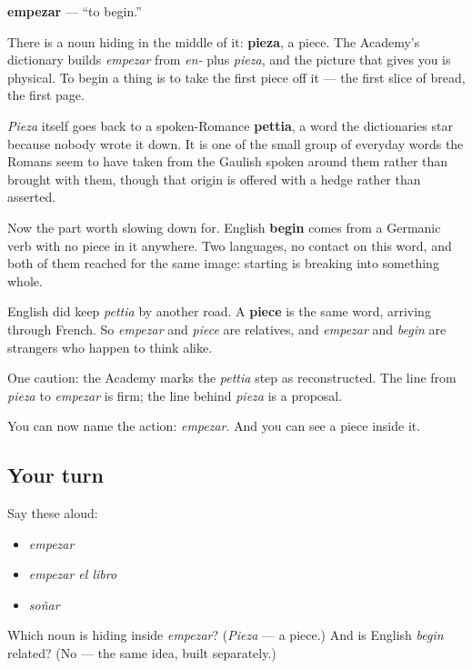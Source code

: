 \begin{cousinweb}
\textbf{empezar} — \textquotedblleft{}to begin.\textquotedblright{}

There is a noun hiding in the middle of it: \textbf{pieza}, a piece. The Academy's dictionary builds \emph{empezar} from \emph{en-} plus \emph{pieza}, and the picture that gives you is physical. To begin a thing is to take the first piece off it — the first slice of bread, the first page.

\emph{Pieza} itself goes back to a spoken-Romance \textbf{pettia}, a word the dictionaries star because nobody wrote it down. It is one of the small group of everyday words the Romans seem to have taken from the Gaulish spoken around them rather than brought with them, though that origin is offered with a hedge rather than asserted.

Now the part worth slowing down for. English \textbf{begin} comes from a Germanic verb with no piece in it anywhere. Two languages, no contact on this word, and both of them reached for the same image: starting is breaking into something whole.

English did keep \emph{pettia} by another road. A \textbf{piece} is the same word, arriving through French. So \emph{empezar} and \emph{piece} are relatives, and \emph{empezar} and \emph{begin} are strangers who happen to think alike.

One caution: the Academy marks the \emph{pettia} step as reconstructed. The line from \emph{pieza} to \emph{empezar} is firm; the line behind \emph{pieza} is a proposal.
\end{cousinweb}

\begin{grammarlens}[title={What you've built}]
You can now name the action: \emph{empezar}. And you can see a piece inside it.
\end{grammarlens}

\subsection*{Your turn}
Say these aloud:

\begin{itemize}
\raggedright
  \item \emph{empezar}
  \item \emph{empezar el libro}
  \item \emph{soñar}
\end{itemize}

\begin{tcolorbox}[breakable,colback=teal!4,colframe=teal!35!black,title={Before you move on}]
Which noun is hiding inside \emph{empezar}? (\emph{Pieza} — a piece.) And is English \emph{begin} related? (No — the same idea, built separately.)
\end{tcolorbox}
